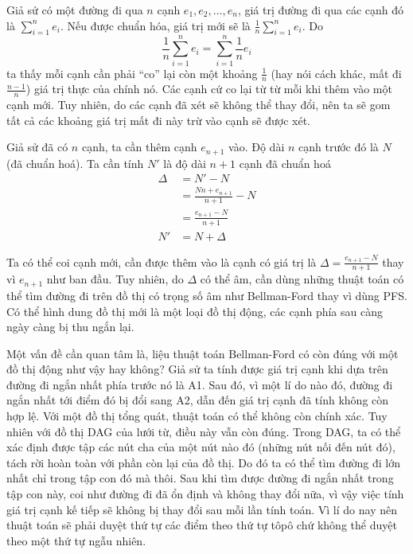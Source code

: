 \documentclass[a4paper,oneside,14pt]{extbook} %
\begin{document}
Giả sử có một đường đi qua $n$ cạnh $e_1,e_2,\ldots,e_n$, giá trị
đường đi qua các cạnh đó là $\sum_{i=1}^{n}e_i$. Nếu được chuẩn hóa,
giá trị mới sẽ là $\frac{1}{n}\sum_{i=1}^{n}e_i$. 
Do $$\frac{1}{n}\sum_{i=1}^{n}e_i=\sum_{i=1}^{n}\frac{1}{n}e_i$$ ta
thấy mỗi cạnh cần phải ``co'' lại còn một khoảng $\frac{1}{n}$ (hay
nói cách khác, mất đi $\frac{n-1}{n}$) giá trị
thực của chính nó. Các cạnh cứ co lại từ từ mỗi khi thêm vào một cạnh
mới. Tuy nhiên, do các cạnh đã xét sẽ không thể thay đổi, nên ta sẽ
gom tất cả các khoảng giá trị mất đi này trừ vào cạnh sẽ được xét.

Giả sử đã có $n$ cạnh, ta cần thêm cạnh $e_{n+1}$ vào. Độ dài $n$ cạnh
trước đó là $N$ (đã chuẩn hoá). Ta cần tính $N'$ là độ dài $n+1$ cạnh đã
chuẩn hoá
\begin{align*}
\Delta&=N'-N\\
      &=\frac{Nn+e_{n+1}}{n+1}-N\\
      &=\frac{e_{n+1}-N}{n+1}\\
N'&=N+\Delta
\end{align*}

Ta có thể coi cạnh mới, cần được thêm vào là cạnh có giá trị là
$\Delta=\frac{e_{n+1}-N}{n+1}$ thay vì $e_{n+1}$ như ban đầu. Tuy
nhiên, do $\Delta$ có thể âm, cần dùng những thuật toán có thể tìm
đường đi trên đồ thị có trọng số âm như Bellman-Ford thay vì dùng
PFS. Có thể hình dung đồ thị mới là một loại đồ thị động, các cạnh
phía sau càng ngày càng bị thu ngắn lại.

Một vấn đề cần quan tâm là, liệu thuật toán Bellman-Ford có còn đúng
với một đồ thị động như vậy hay không? Giả sử ta tính được giá trị
cạnh khi dựa trên đường đi ngắn nhất phía trước nó là A1. Sau đó, vì
một lí do nào đó, đường đi ngắn nhất tới điểm đó bị đổi sang A2, dẫn
đến giá trị cạnh đã tính không còn hợp lệ. Với một đồ thị tổng quát, thuật
toán có thể không còn chính xác. Tuy nhiên với đồ thị DAG của lưới từ,
điều này vẫn còn đúng. Trong DAG, ta có thể xác định được tập các nút
cha của một nút nào đó (những nút nối đến nút đó), tách rời hoàn toàn
với phần còn lại của đồ thị. Do đó ta có thể tìm đường đi lớn nhất chỉ
trong tập con đó mà thôi. Sau khi tìm được đường đi ngắn nhất trong
tập con này, coi như đường đi đã ổn định và không thay đổi nữa, vì vậy
việc tính giá trị cạnh kế tiếp sẽ không bị thay đổi sau mỗi lần tính
toán. Vì lí do nay nên thuật toán sẽ phải duyệt thứ tự các điểm theo
thứ tự tôpô chứ không thể duyệt theo một thứ tự ngẫu nhiên.
\end{document}

